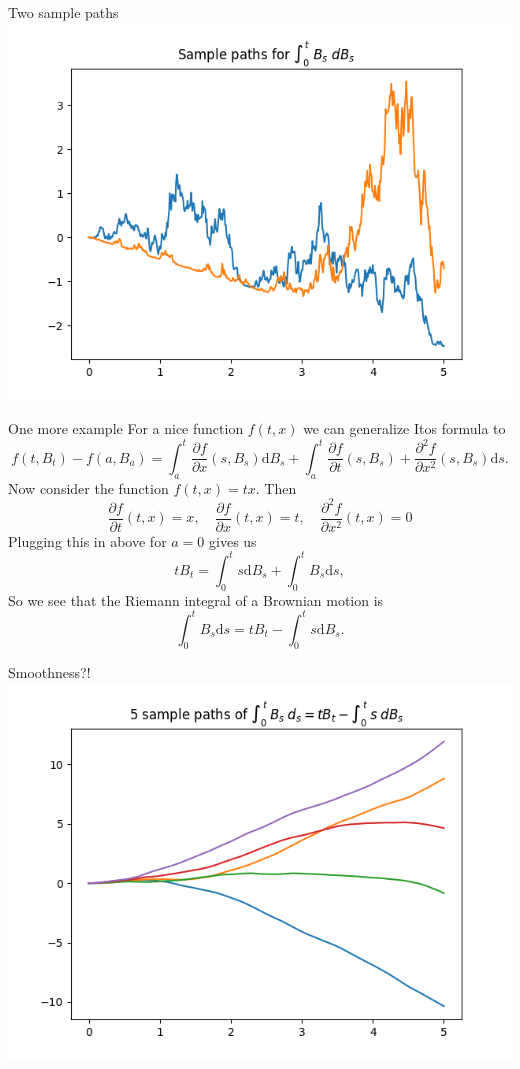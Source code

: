 \documentclass{beamer}%
\numberwithin{equation}{section}
\newcommand{\ud}{\ensuremath{\mathrm{d} }}
\begin{document}
\begin{frame}{Two sample paths}
	\includegraphics[scale=.7]{StochIntegralExample}
\end{frame}

\begin{frame}[t]{One more example}
	For a nice function $f(t,x)$ we can generalize Itos formula to 
	\[
	f(t,B_t) - f(a, B_a) = \int_a^t \frac{\partial f}{\partial x}(s, B_s) \ud B_s + \int_a^t \frac{\partial f}{\partial t}(s, B_s) + \frac{\partial^2 f}{\partial x^2}(s, B_s) \ud s.
	\]
	Now consider the function $f(t,x) = tx$. Then 
	\[
	\frac{\partial f}{\partial t}(t,x) = x, \quad \frac{\partial f}{\partial x}(t,x) = t, \quad \frac{\partial^2 f}{\partial x^2}(t,x) =0
	\]
	Plugging this in above for $a=0$ gives us
	\[
	tB_t = \int_0^t s \ud B_s + \int_0^t B_s \ud s,
	\]
	So we see that the Riemann integral of a Brownian motion is 
	\[
	\int_0^t B_s \ud s = t B_t -  \int_0^t s \ud B_s.
	\]
\end{frame}

\begin{frame}[t]{Smoothness?!}
	\centering
	\includegraphics[scale=.6]{riemannBM.png}
\end{frame}
\end{document}
